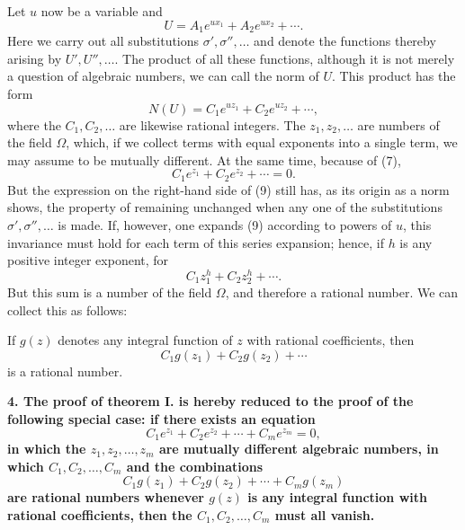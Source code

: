\documentclass[11pt]{article}
\begin{document}
Let $u$ now be a variable and
\begin{equation}\tag{8}
U=A_1e^{ux_1}+A_2e^{ux_2}+\cdots .
\end{equation}
Here we carry out all substitutions $\sigma',\sigma'',\ldots$ and denote the functions thereby arising by $U',U'',\ldots$. The product of all these functions, although it is not merely a question of algebraic numbers, we can call the norm of $U$. This product has the form
\begin{equation}\tag{9}
N(U)=C_1e^{uz_1}+C_2e^{uz_2}+\cdots,
\end{equation}
where the $C_1,C_2,\ldots$ are likewise rational integers. The $z_1,z_2,\ldots$ are numbers of the field $\Omega$, which, if we collect terms with equal exponents into a single term, we may assume to be mutually different. At the same time, because of (7),
\begin{equation}\tag{10}
C_1e^{z_1}+C_2e^{z_2}+\cdots=0.
\end{equation}
But the expression on the right-hand side of (9) still has, as its origin as a norm shows, the property of remaining unchanged when any one of the substitutions $\sigma',\sigma'',\ldots$ is made. If, however, one expands (9) according to powers of $u$, this invariance must hold for each term of this series expansion; hence, if $h$ is any positive integer exponent, for
\[
C_1z_1^h+C_2z_2^h+\cdots.
\]
But this sum is a number of the field $\Omega$, and therefore a rational number. We can collect this as follows:

If $g(z)$ denotes any integral function of $z$ with rational coefficients, then
\[
C_1g(z_1)+C_2g(z_2)+\cdots
\]
is a rational number.

\textbf{4. The proof of theorem I. is hereby reduced to the proof of the following special case: if there exists an equation}
\begin{equation}\tag{11}
C_1e^{z_1}+C_2e^{z_2}+\cdots+C_me^{z_m}=0,
\end{equation}
\textbf{in which the $z_1,z_2,\ldots,z_m$ are mutually different algebraic numbers, in which $C_1,C_2,\ldots,C_m$ and the combinations}
\begin{equation}\tag{12}
C_1g(z_1)+C_2g(z_2)+\cdots+C_mg(z_m)
\end{equation}
\textbf{are rational numbers whenever $g(z)$ is any integral function with rational coefficients, then the $C_1,C_2,\ldots,C_m$ must all vanish.}
\end{document}
